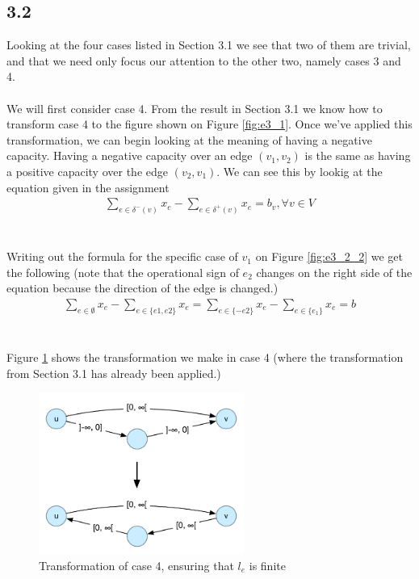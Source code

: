 \documentclass[12pt]{article}
\begin{document}
\subsection{3.2}
Looking at the four cases listed in Section 3.1 we see that two of them are trivial, and that we need only focus our attention to the other two, namely cases 3 and 4.\\
\\
We will first consider case 4. From the result in Section 3.1 we know how to transform case 4 to the figure shown on Figure \ref{fig:e3_1}. Once we've applied this transformation, we can begin looking at the meaning of having a negative capacity. Having a negative capacity over an edge $(v_1, v_2)$ is the same as having a positive capacity over the edge $(v_2, v_1)$. We can see this by lookig at the equation given in the assignment
\begin{align*}
    \sum_{e\in \delta^-(v)}{x_e}-\sum_{e\in \delta^+(v)}{x_e} = b_v, \forall{v} \in V
\end{align*}~\\
\\
Writing out the formula for the specific case of $v_1$ on Figure \ref{fig:e3_2_2} we get the following (note that the operational sign of $e_2$ changes on the right side of the equation because the direction of the edge is changed.)
\begin{align*}
    \sum_{e\in \emptyset}{x_e} - \sum_{e\in \{e1, e2\}}{x_e} =
    \sum_{e\in \{-e2\}}{x_e} - \sum_{e\in \{e_1\}}{x_e} = b
\end{align*}~\\
\\
Figure \ref{fig:e3_2} shows the transformation we make in case 4 (where the transformation from Section 3.1 has already been applied.)

\begin{figure}[h]
  \centering
    \includegraphics[width=0.6\textwidth]{figures/e3_2}
  \caption{Transformation of case 4, ensuring that $l_e$ is finite}
  \label{fig:e3_2}
\end{figure}
\end{document}
